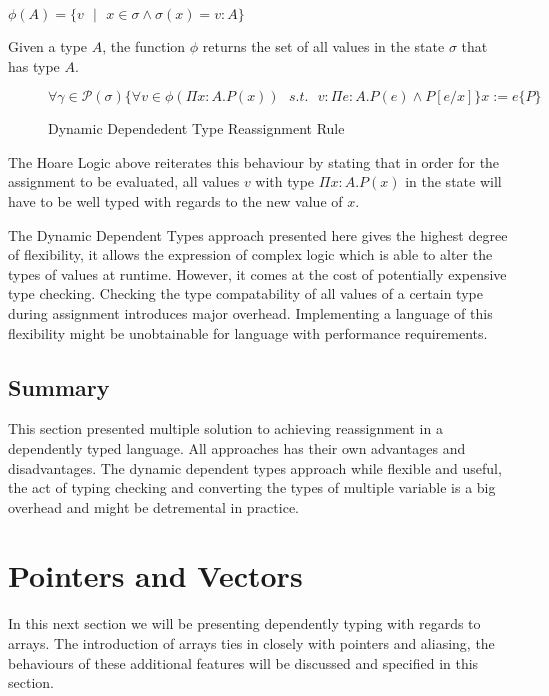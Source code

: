 \documentclass[a4paper,12pt]{report}
\begin{document}
\begin{center}
  $\phi(A) = \{v\text{ }|\text{ }x \in \sigma \wedge \sigma(x) = v : A\}$  
\end{center}

\par
Given a type $A$, the function $\phi$ returns the set of all values in the 
state $\sigma$ that has type $A$.

\begin{figure}[H]
  \begin{center}
    $\forall \gamma \in \mathcal{P}(\sigma)\{\forall v \in \phi(\Pi x : A.P(x)) 
    \text{ }s.t.\text{ }v : \Pi e : A. P(e) \wedge P[e/x]\}
    x:= e\{P\}$ 
  \end{center}
  \caption{Dynamic Dependedent Type Reassignment Rule}
\end{figure}


\par
The Hoare Logic above reiterates this behaviour by stating that in order for the 
assignment to be evaluated, all values $v$ with type $\Pi x : A.P(x)$ in the state 
will have to be well typed with regards to the new value of $x$.

\par
The Dynamic Dependent Types approach presented here gives the highest degree of 
flexibility, it allows the expression of complex logic which is able to alter 
the types of values at runtime. However, it comes at the cost of potentially 
expensive type checking. Checking the type compatability of all values of a 
certain type during assignment introduces major overhead. Implementing a 
language of this flexibility might be unobtainable for language with performance 
requirements. 

\subsection{Summary}
This section presented multiple solution to achieving reassignment in a 
dependently typed language. All approaches has their own advantages and 
disadvantages. The dynamic dependent types approach while flexible and useful, 
the act of typing checking and converting the types of multiple variable is a 
big overhead and might be detremental in practice. 

\section{Pointers and Vectors}
In this next section we will be presenting dependently typing with regards to 
arrays. The introduction of arrays ties in closely with pointers and aliasing, 
the behaviours of these additional features will be discussed and specified in this 
section.
\end{document}
